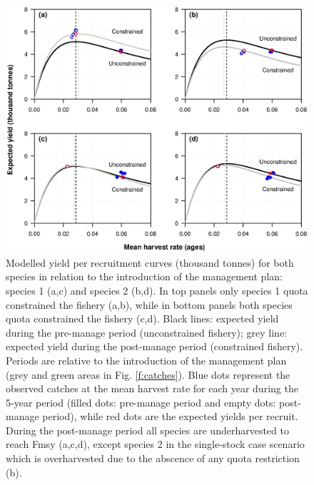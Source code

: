 \documentclass[12pt,oneline,a4paper,numbib]{ouparticle}
\numberwithin{equation}{subsection} %
\begin{document}
\begin{figure}[!ht]
\centering
\includegraphics[width=\textwidth]{Figures/Yields.eps} 
\caption{Modelled yield per recruitment curves (thousand tonnes) for both species in relation to the introduction of the management plan: species 1 (a,c) and species 2 (b,d). In top panels only species 1 quota constrained the fishery (a,b), while in bottom panels both species quota constrained the fishery (c,d). Black lines: expected yield during the pre-manage period (unconstrained fishery); grey line: expected yield during the post-manage period (constrained fishery). Periods are relative to the introduction of the management plan (grey and green areas in Fig. \ref{f:catches}). Blue dots represent the observed catches at the mean harvest rate for each year during the 5-year period (filled dots: pre-manage period and empty dots: post-manage period), while red dots are the expected yields per recruit. During the post-manage period all species are underharvested to reach Fmsy (a,c,d), except species 2 in the single-stock case scenario which is overharvested due to the abscence of any quota restriction (b).}
\label{f:yields}
\end{figure}
\end{document}
